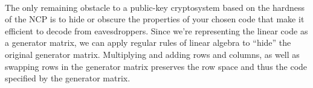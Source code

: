 \documentclass[15pt]{article}
\theoremstyle{definition}
\begin{document}
\paragraph{}
The only remaining obstacle to a public-key cryptosystem based on the hardness of the NCP is to hide or obscure the properties of your chosen code that make it efficient to decode from eavesdroppers. Since we're representing the linear code as a generator matrix, we can apply regular rules of linear algebra to ``hide'' the original generator matrix. Multiplying and adding rows and columns, as well as swapping rows in the generator matrix preserves the row space and thus the code specified by the generator matrix.
\end{document}
